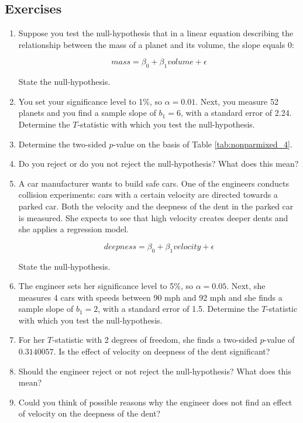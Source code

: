 \documentclass[]{report}\usepackage[]{graphicx}\usepackage[]{color}
\begin{document}
\subsection{Exercises}

\begin{enumerate}

\item Suppose you test the null-hypothesis that in a linear equation describing the relationship between the mass of a planet and its volume, the slope equals 0:

\begin{equation}
mass = \beta_0 + \beta_1 volume + \epsilon
\end{equation}

State the null-hypothesis.


\item You set your significance level to 1\%, so $\alpha=0.01$. Next, you measure 52 planets and you find a sample slope of $b_1=6$, with a standard error of 2.24. Determine the $T$-statistic with which you test the null-hypothesis.

\item Determine the two-sided $p$-value on the basis of Table \ref{tab:nonparmixed_4}.

\item Do you reject or do you not reject the null-hypothesis? What does this mean?

\item A car manufacturer wants to build safe cars. One of the engineers conducts collision experiments: cars with a certain velocity are directed towards a parked car. Both the velocity and the deepness of the dent in the parked car is measured. She expects to see that high velocity creates deeper dents and she applies a regression model.

\begin{equation}
deepness = \beta_0 + \beta_1 velocity + \epsilon
\end{equation}

State the null-hypothesis.

\item The engineer sets her significance level to 5\%, so $\alpha=0.05$. Next, she measures 4 cars with speeds between 90 mph and 92 mph and she finds a sample slope of $b_1=2$, with a standard error of 1.5. Determine the $T$-statistic with which you test the null-hypothesis.

\item For her $T$-statistic with 2 degrees of freedom, she finds a two-sided $p$-value of $0.3140057$. Is the effect of velocity on deepness of the dent significant?

\item Should the engineer reject or not reject the null-hypothesis? What does this mean?

\item Could you think of possible reasons why the engineer does not find an effect of velocity on the deepness of the dent?

\end{enumerate}
\end{document}

